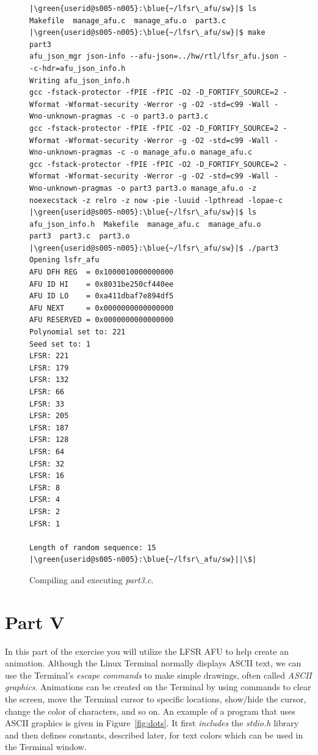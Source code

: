 \documentclass[epsfig,10pt,fullpage]{article}
\begin{document}
\begin{figure}[H]
\begin{center}
\begin{minipage}[h]{\textwidth}
\begin{lstlisting}[name=output]
|\green{userid@s005-n005}:\blue{~/lfsr\_afu/sw}|$ ls
Makefile  manage_afu.c  manage_afu.o  part3.c
|\green{userid@s005-n005}:\blue{~/lfsr\_afu/sw}|$ make part3
afu_json_mgr json-info --afu-json=../hw/rtl/lfsr_afu.json --c-hdr=afu_json_info.h
Writing afu_json_info.h
gcc -fstack-protector -fPIE -fPIC -O2 -D_FORTIFY_SOURCE=2 -Wformat -Wformat-security -Werror -g -O2 -std=c99 -Wall -Wno-unknown-pragmas -c -o part3.o part3.c
gcc -fstack-protector -fPIE -fPIC -O2 -D_FORTIFY_SOURCE=2 -Wformat -Wformat-security -Werror -g -O2 -std=c99 -Wall -Wno-unknown-pragmas -c -o manage_afu.o manage_afu.c
gcc -fstack-protector -fPIE -fPIC -O2 -D_FORTIFY_SOURCE=2 -Wformat -Wformat-security -Werror -g -O2 -std=c99 -Wall -Wno-unknown-pragmas -o part3 part3.o manage_afu.o -z noexecstack -z relro -z now -pie -luuid -lpthread -lopae-c
|\green{userid@s005-n005}:\blue{~/lfsr\_afu/sw}|$ ls
afu_json_info.h  Makefile  manage_afu.c  manage_afu.o  part3  part3.c  part3.o
|\green{userid@s005-n005}:\blue{~/lfsr\_afu/sw}|$ ./part3
Opening lsfr_afu
AFU DFH REG  = 0x1000010000000000
AFU ID HI    = 0x8031be250cf440ee
AFU ID LO    = 0xa411dbaf7e894df5
AFU NEXT     = 0x0000000000000000
AFU RESERVED = 0x0000000000000000
Polynomial set to: 221
Seed set to: 1
LFSR: 221
LFSR: 179
LFSR: 132
LFSR: 66
LFSR: 33
LFSR: 205
LFSR: 187
LFSR: 128
LFSR: 64
LFSR: 32
LFSR: 16
LFSR: 8
LFSR: 4
LFSR: 2
LFSR: 1

Length of random sequence: 15
|\green{userid@s005-n005}:\blue{~/lfsr\_afu/sw}||\$|
\end{lstlisting}
\end{minipage}
\caption{Compiling and executing {\it part3.c}.}
\label{fig:output}
\end{center}
\end{figure}

\section*{Part V}

In this part of the exercise you will utilize the LFSR AFU to help create an animation.
Although the Linux Terminal normally displays ASCII text, we can use the 
Terminal's {\it escape commands} to make simple drawings, often called 
{\it ASCII graphics}. Animations can be created on the Terminal by using commands to 
clear the screen, move the Terminal cursor to specific locations, show/hide the cursor, 
change the color of characters, and so on. An example of a program that uses ASCII graphics is 
given in Figure~\ref{fig:dots}. 
It first {\it includes} the {\it stdio.h} library and then 
defines constants, described later, for text colors which can be used in the Terminal window. 
\end{document}

